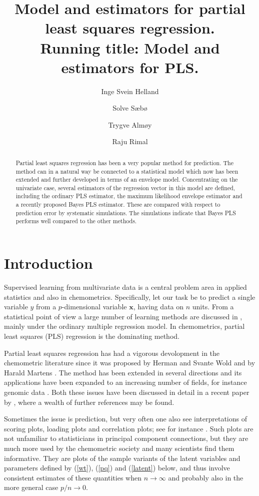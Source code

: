 \documentclass[num-refs]{wiley-article}
\title{Model and estimators for partial least squares regression. \\
  Running title: Model and estimators for PLS.}
\author[1]{Inge Svein Helland}
\author[2]{Solve S\ae b\o}
\author[2]{Trygve Alm\o y}
\author[2]{Raju Rimal}
\affil[1]{University of Oslo}
\affil[2]{Norwegian University of Life Sciences}
\begin{document}
\maketitle

\begin{abstract}
Partial least squares regression has been a very popular method for prediction. The method can in a natural way be connected to a statistical model which now has been extended and further developed in terms of an envelope model. Concentrating on the univariate case, several estimators of the regression vector in this model are defined, including the ordinary PLS estimator, the maximum likelihood envelope estimator and a recently proposed Bayes PLS estimator. These are compared with respect to prediction error by systematic simulations. The simulations indicate that Bayes PLS performs well compared to the other methods.


\end{abstract}

\section{Introduction}

Supervised learning from multivariate data is a central problem area in applied statistics and also in chemometrics. Specifically, let our task be to predict a single variable $y$ from a $p$-dimensional variable $\bm{x}$, having data on $n$ units. From a statistical point of view a large number of learning methods are discussed in \citet{hastie2009elements}, mainly under the ordinary multiple regression model. In chemometrics, partial least squares (PLS) regression is the dominating method.

Partial least squares regression has had a vigorous devolopment in the
chemometric literature since it was proposed by Herman and Svante Wold and by
Harald Martens \citep{wold1983collinearity, martens1989multivariate}. The method
has been extended in several directions and its applications have been expanded
to an increasing number of fields, for instance genomic data
\citep{boulesteix2007partial}. Both these issues have been discussed in detail
in a recent paper by  \citet{mehmood2016diversity}, where a wealth of further references may be found.

Sometimes the issue is prediction, but very often one also see interpretations of scoring plots, loading plots and correlation plots; see for instance \citet{martens2001multivariate}. Such plots are not unfamiliar to statisticians in principal component connections, but they are much more used by the chemometric society and many scientists find them informative. They are plots of the sample variants of the latent variables and parameters defined by (\ref{wt}), (\ref{pq}) and (\ref{latent}) below, and thus involve consistent estimates of these quantities when $n\rightarrow\infty$ and probably also in the more general case $p/n\rightarrow 0$.
\end{document}
